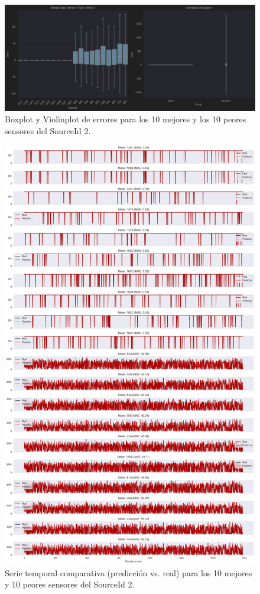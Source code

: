 \begin{figure}[H]
	\centering
	\includegraphics[width=0.75\linewidth]{includes/cap5/graphs/advanced/sid2_10best_10worst_meter_boxplot_violinplot.png}
	\caption{Boxplot y Violinplot de errores para los 10 mejores y los 10 peores sensores del SourceId 2.}
	\label{fig:sid2_violinplot_best_worst}
\end{figure}

\begin{figure}[H]
	\centering
	\includegraphics[width=0.75\linewidth]{includes/cap5/graphs/advanced/sid2_10best_10worst_meter_time_series.png}
	\caption{Serie temporal comparativa (predicción vs. real) para los 10 mejores y 10 peores sensores del SourceId 2.}
	\label{fig:sid2_timeseries_best_worst}
\end{figure}

